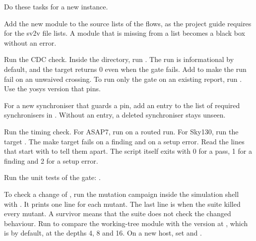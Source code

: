 Do these tasks for a new instance.
\begin{procedure}
  \item Add the new module to the source lists of the flows, as the project guide requires for the sv2v file lists. A module that is missing from a list becomes a black box without an error.
  \item Run the CDC check. Inside the  directory, run . The run is informational by default, and the target returns 0 even when the gate fails. Add  to make the run fail on an unwaived crossing. To run only the gate on an existing report, run . Use the yosys version that  pins.
  \item For a new synchroniser that guards a pin, add an entry to the list of required synchronisers in . Without an entry, a deleted synchroniser stays unseen.
  \item Run the timing check. For ASAP7, run  on a routed run. For Sky130, run the target . The make target fails on a finding and on a setup error. Read the lines that start with  to tell them apart. The script itself exits with 0 for a pass, 1 for a finding and 2 for a setup error.
  \item Run the unit tests of the gate: .
\end{procedure}
To check a change of , run the mutation campaign inside the simulation shell with . It prints one line for each mutant. The last line is  when the suite killed every mutant. A survivor means that the suite does not check the changed behaviour. Run  to compare the working-tree module with the version at , which is  by default, at the depths 4, 8 and 16. On a new host, set  and .

